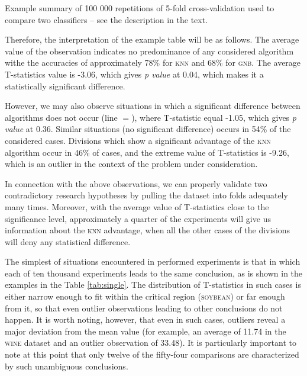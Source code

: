 \documentclass[final,3p,times,onecolumn]{elsarticle}
\begin{document}
\begin{table}[!h]
	\centering
	\caption{Example summary of 100 000 repetitions of 5-fold cross-validation used to compare two classifiers – see the description in the text.}
	\label{tab:example}


\end{table}

Therefore, the interpretation of the example table will be as follows. The average value of the observation indicates no predominance of any considered algorithm withe the accuracies of approximately 78\% for \textsc{knn} and 68\% for \textsc{gnb}. The average T-statistics value is -3.06, which gives \emph{p value} at 0.04, which makes it a statistically significant difference.

However, we may also observe situations in which a significant difference between algorithms does not occur (line $=$), where T-statistic equal -1.05, which gives \emph{p value} at 0.36. Similar situations (no significant difference) occurs in 54\% of the considered cases. Divisions which show a significant advantage of the \textsc{knn} algorithm occur in 46\% of cases, and the extreme value of T-statistics is -9.26, which is an outlier in the context of the problem under consideration.

In connection with the above observations, we can properly validate two contradictory research hypotheses by pulling the dataset into folds adequately many times. Moreover, with the average value of T-statistics close to the significance level, approximately a quarter of the experiments will give us information about the \textsc{knn} advantage, when all the other cases of the divisions will deny any statistical difference.

The simplest of situations encountered in performed experiments is that in which each of ten thousand experiments leads to the same conclusion, as is shown in the examples in the Table \ref{tab:single}. The distribution of T-statistics in such cases is either narrow enough to fit within the critical region (\textsc{soybean}) or far enough from it, so that even outlier observations leading to other conclusions do not happen. It is worth noting, however, that even in such cases, outliers reveal a major deviation from the mean value (for example, an average of 11.74 in the \textsc{wine} dataset and an outlier observation of 33.48). It is particularly important to note at this point that only twelve of the fifty-four comparisons are characterized by such unambiguous conclusions.
\end{document}

